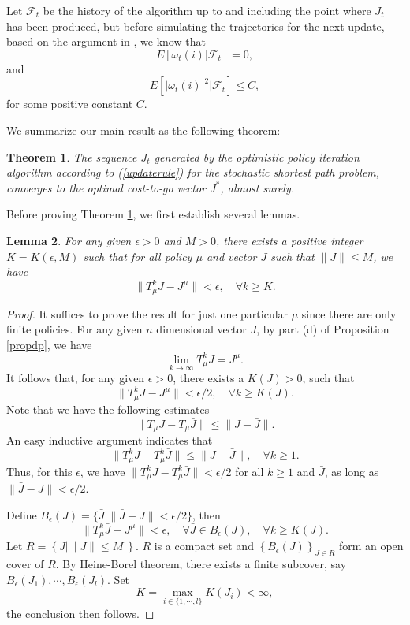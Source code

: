 \documentclass[12pt,a4paper]{amsart}
\numberwithin{equation}{section}
\theoremstyle{plain}
\newtheorem{Th}{Theorem}[section]
\newtheorem{Lemma}[Th]{Lemma}
\theoremstyle{definition}
\begin{document}
Let $\mathcal{F}_t$ be the history of the algorithm up to and including the point where $J_t$ has been produced, but before simulating the trajectories for the next update, based on the argument in \cite{Ts03}, we know that 
$$
E\left[\omega_t(i) | \mathcal{F}_t \right] = 0,
$$
and
$$
E\left[ |\omega_t(i)|^2 | \mathcal{F}_t \right] \leq C,
$$
for some positive constant $C$.  

We summarize our main result as the following theorem:
\begin{Th}\label{main}
	The sequence $J_t$ generated by the optimistic policy iteration algorithm according to (\ref{updaterule}) for the  stochastic shortest path problem,  converges to the optimal cost-to-go vector $J^*$, almost surely. 
\end{Th}

Before proving Theorem \ref{main}, we first establish several lemmas. 

\begin{Lemma}\label{lmapprox}
	For any given $\epsilon > 0$ and $M >0$, there exists a positive integer $K = K(\epsilon, M)$ such that for all policy $\mu$ and vector $J$ such that $\|J\| \le M$, we have 
	$$
	\|T_{\mu}^k J - J^{\mu}\| < \epsilon, \quad \forall k \ge K.
	$$
\end{Lemma}
\begin{proof}
	 It suffices to prove the result for just one particular $\mu$ since there are only finite policies. For any given $n$ dimensional vector $J$, by part (d) of Proposition \ref{propdp}, we have
	$$
	\lim_{k \to \infty} T_{\mu}^k J = J^{\mu}.
	$$
	It follows that, for any given $\epsilon > 0$, there exists a $K(J) > 0$, such that
	\begin{equation} \label{lem2.2est1}
	\| T_{\mu}^{k}J - J^{\mu}\| < \epsilon/2, \quad \forall k \ge K(J). 
	\end{equation}
	Note that we have the following estimates
    $$
	\|T_{\mu} J - T_{\mu} \bar{J}\| \le \| J - \bar{J}\|.
	$$
	An easy inductive argument indicates that 
    $$
	\|T_{\mu}^k J - T_{\mu}^{k} \bar{J}\| \le \|J -  \bar{J}\|, \quad \forall k \ge 1.
    $$
	Thus, for this $\epsilon$, we have $ \| T_{\mu}^{k} J - T_{\mu}^{k} \bar{J} \| < \epsilon/2$ for all $k \ge 1$ and $\bar{J}$, as long as $\|\bar{J} - J\| < \epsilon / 2$.
	
	 Define $B_{\epsilon}(J) = \{ \bar{J} | \|\bar{J} - J\| < \epsilon/2 \}$, then 
	$$
	\| T_{\mu}^{k}\bar{J} - J^{\mu}\| < \epsilon, \quad \forall \bar{J} \in B_{\epsilon}(J),  \quad \forall k \ge K(J). 
	$$
	Let $R = \left\{J | \|J\| \leq M\ \right\}$. $R$ is a compact set and $\left\{ B_{\epsilon}(J)\right\}_{J\in R}$ form an open cover of $R$. By Heine-Borel theorem, there exists a finite subcover, say $B_{\epsilon}(J_1), \cdots, B_{\epsilon}(J_l)$. Set 
	$$
	K = \max_{i \in \{1,\cdots, l\}} K(J_i) < \infty,
	$$ 
	the conclusion then follows. 
\end{proof}
\end{document}
